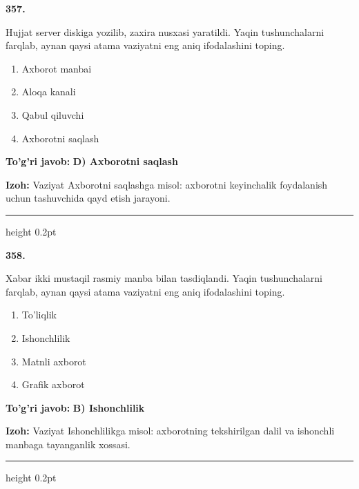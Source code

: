 \documentclass[10pt,a4paper,oneside]{article}
\begin{document}
\noindent\textbf{\color{ink}357.}
\par
Hujjat server diskiga yozilib, zaxira nusxasi yaratildi. Yaqin tushunchalarni farqlab, aynan qaysi atama vaziyatni eng aniq ifodalashini toping.
\begin{enumerate}[label=\Alph*),leftmargin=9mm]
\item Axborot manbai
\item Aloqa kanali
\item Qabul qiluvchi
\item Axborotni saqlash
\end{enumerate}
\begin{tcolorbox}[enhanced,breakable,colback=teal!4,colframe=teal!50!black,boxrule=0.5pt,arc=1.1mm,left=3mm,right=3mm,top=1.7mm,bottom=1.7mm,before skip=2mm,after skip=2mm]
\textbf{\color{teal}To'g'ri javob:} \textbf{D) Axborotni saqlash}
\par\smallskip
\textbf{Izoh:} Vaziyat Axborotni saqlashga misol: axborotni keyinchalik foydalanish uchun tashuvchida qayd etish jarayoni.
\end{tcolorbox}
\vspace{2mm}\hrule height 0.2pt \vspace{3mm}

\noindent\textbf{\color{ink}358.}
\par
Xabar ikki mustaqil rasmiy manba bilan tasdiqlandi. Yaqin tushunchalarni farqlab, aynan qaysi atama vaziyatni eng aniq ifodalashini toping.
\begin{enumerate}[label=\Alph*),leftmargin=9mm]
\item To'liqlik
\item Ishonchlilik
\item Matnli axborot
\item Grafik axborot
\end{enumerate}
\begin{tcolorbox}[enhanced,breakable,colback=teal!4,colframe=teal!50!black,boxrule=0.5pt,arc=1.1mm,left=3mm,right=3mm,top=1.7mm,bottom=1.7mm,before skip=2mm,after skip=2mm]
\textbf{\color{teal}To'g'ri javob:} \textbf{B) Ishonchlilik}
\par\smallskip
\textbf{Izoh:} Vaziyat Ishonchlilikga misol: axborotning tekshirilgan dalil va ishonchli manbaga tayanganlik xossasi.
\end{tcolorbox}
\vspace{2mm}\hrule height 0.2pt \vspace{3mm}
\end{document}
